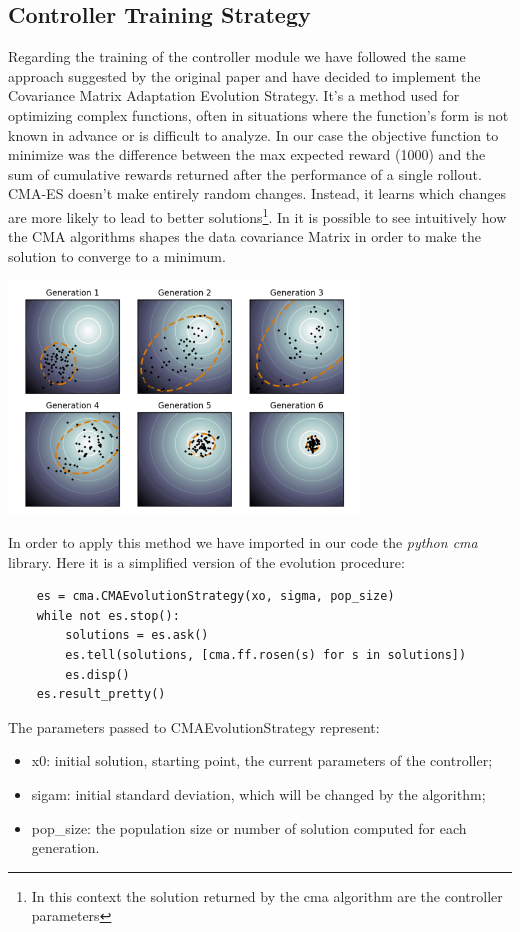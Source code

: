 \documentclass[10pt,a4paper]{article}
\begin{document}
\subsection{Controller Training Strategy}
Regarding the training of the controller module we have followed the same approach suggested by the original paper and have decided to implement the Covariance Matrix Adaptation Evolution Strategy.  It's a method used for optimizing complex functions, often in situations where the function's form is not known in advance or is difficult to analyze. In our case the objective function to minimize was the difference between the max expected reward (1000) and the sum of cumulative rewards returned after the performance of a single rollout. CMA-ES doesn't make entirely random changes. Instead, it learns which changes are more likely to lead to better solutions\footnote[1]{In this context the solution returned by the cma algorithm are the controller parameters}. In it is possible to see intuitively how the CMA algorithms shapes the data covariance Matrix in order to make the solution to converge to a minimum.
\vspace*{5pt}
\begin{center}
    \includegraphics[width=0.7\textwidth]{images/cma-es.png} \label{fig:cma}
\end{center}
In order to apply this method we have imported in our code the \textit{python cma} library. Here it is a simplified version of the evolution procedure:
\begin{lstlisting}
    es = cma.CMAEvolutionStrategy(xo, sigma, pop_size)
    while not es.stop():
        solutions = es.ask()
        es.tell(solutions, [cma.ff.rosen(s) for s in solutions])
        es.disp()
    es.result_pretty()
\end{lstlisting}
The parameters passed to CMAEvolutionStrategy represent:
\begin{itemize}
    \item x0: initial solution, starting point, the current parameters of the controller;
    \item sigam: initial standard deviation, which will be changed by the algorithm;
    \item pop\_size: the population size or number of solution computed for each generation.
\end{itemize}
\end{document}
